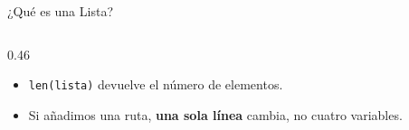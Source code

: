 \documentclass[aspectratio=169, 11pt]{beamer}
\begin{document}
\begin{frame}[fragile,shrink=30]{¿Qué es una Lista?}
\begin{columns}[T]
\begin{column}{0.46\textwidth}
{\begin{itemize}
        \item[{\color{arcaRed}\scriptsize\faArrowRight}]
          \texttt{len(lista)} devuelve el
          número de elementos.

        \item[{\color{arcaRed}\scriptsize\faArrowRight}]
          Si añadimos una ruta, \textbf{una sola
          línea} cambia, no cuatro variables.
      \end{itemize}
      }
    \end{column}
  \end{columns}
\end{frame}

\end{document}
